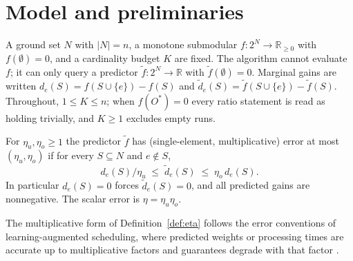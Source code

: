 
\section{Model and preliminaries}\label{sec:model}

A ground set $N$ with $|N|=n$, a monotone submodular $f:2^{N}\to\mathbb
R_{\ge0}$ with $f(\emptyset)=0$, and a cardinality budget $K$ are fixed.  The
algorithm cannot evaluate $f$; it can only query a predictor
$\tilde f:2^{N}\to\mathbb R$ with $\tilde f(\emptyset)=0$.  Marginal gains are
written $d_e(S)=f(S\cup\{e\})-f(S)$ and
$\tilde d_e(S)=\tilde f(S\cup\{e\})-\tilde f(S)$.
Throughout, $1\le K\le n$; when $f(O^{\ast})=0$ every ratio statement is
read as holding trivially, and $K\ge1$ excludes empty runs.

\begin{definition}\label{def:eta}
For $\eta_u,\eta_o\ge1$ the predictor $\tilde f$ has (single-element,
multiplicative) error at most $(\eta_u,\eta_o)$ if for every $S\subseteq N$
and $e\notin S$,
\[
  d_e(S)/\eta_u\;\le\;\tilde d_e(S)\;\le\;\eta_o\,d_e(S).
\]
In particular $d_e(S)=0$ forces $\tilde d_e(S)=0$, and all predicted gains are
nonnegative.  The scalar error is $\eta=\eta_u\eta_o$.
\end{definition}
The multiplicative form of Definition~\ref{def:eta} follows the error
conventions of learning-augmented scheduling, where predicted weights or
processing times are accurate up to multiplicative factors and guarantees
degrade with that factor
\citep{lattanzi2020online,azar2021flow,zhao2022real}.

